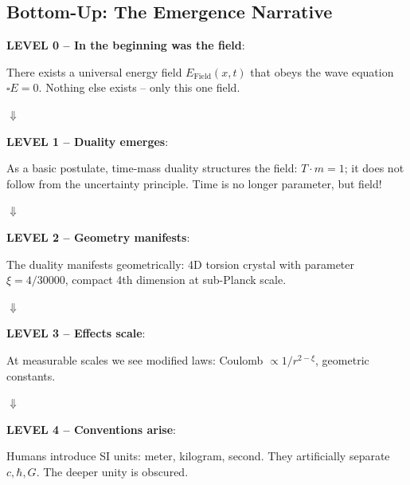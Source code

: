 	\subsection{Bottom-Up: The Emergence Narrative}
	
	\begin{revolutionary}
		\textbf{LEVEL 0 -- In the beginning was the field}:
		
		There exists a universal energy field $E_{\text{Field}}(x,t)$ that obeys the wave equation $\square E = 0$. Nothing else exists -- only this one field.
		
		\vspace{0.3cm}
		
		$\Downarrow$
		
		\vspace{0.3cm}
		
		\textbf{LEVEL 1 -- Duality emerges}:
		
		As a basic postulate, time-mass duality structures the field: $T \cdot m = 1$; it does not follow from the uncertainty principle. Time is no longer parameter, but field!
		
		\vspace{0.3cm}
		
		$\Downarrow$
		
		\vspace{0.3cm}
		
		\textbf{LEVEL 2 -- Geometry manifests}:
		
		The duality manifests geometrically: 4D torsion crystal with parameter $\xi = 4/30000$, compact 4th dimension at sub-Planck scale.
		
		\vspace{0.3cm}
		
		$\Downarrow$
		
		\vspace{0.3cm}
		
		\textbf{LEVEL 3 -- Effects scale}:
		
		At measurable scales we see modified laws: Coulomb $\propto 1/r^{2-\xi}$, geometric constants.
		
		\vspace{0.3cm}
		
		$\Downarrow$
		
		\vspace{0.3cm}
		
		\textbf{LEVEL 4 -- Conventions arise}:
		
		Humans introduce SI units: meter, kilogram, second. They artificially separate $c, \hbar, G$. The deeper unity is obscured.
	\end{revolutionary}
	
